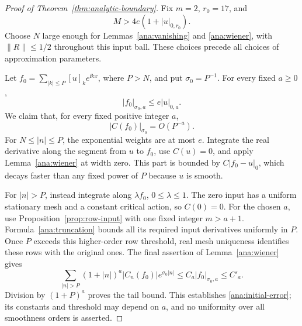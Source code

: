 \begin{proof}[Proof of Theorem~\ref{thm:analytic-boundary}]
Fix \(m=2\), \(r_0=17\), and
\[
 M>4e(1+|u|_{0,r_0}).
\]
Choose \(N\) large enough for Lemmas~\ref{ana:vanishing} and
\ref{ana:wiener}, with \(\|R\|\le1/2\) throughout this input ball.
These choices precede all choices of approximation parameters.

Let \(f_0=\sum_{|k|\le P}[u]_ke^{\ii kx}\), where \(P>N\), and
put \(\sigma_0=P^{-1}\).  For every fixed \(a\ge0\),
\begin{equation}\label{ana:truncation}
 |f_0|_{\sigma_0,a}\le e|u|_{0,a}.
\end{equation}
We claim that, for every fixed positive integer \(a\),
\begin{equation}\label{ana:initial-error}
 |C(f_0)|_{\sigma_0}=O(P^{-a}).
\end{equation}
For \(N\le|n|\le P\), the exponential weights are at most \(e\).
Integrate the real derivative along the segment from \(u\) to \(f_0\),
use \(C(u)=0\), and apply Lemma~\ref{ana:wiener} at width zero.
This part is bounded by \(C|f_0-u|_0\), which decays faster than
any fixed power of \(P\) because \(u\) is smooth.

For \(|n|>P\), instead integrate along \(\lambda f_0\),
\(0\le\lambda\le1\).  The zero input has a uniform stationary mesh
and a constant critical action, so \(C(0)=0\).  For the chosen \(a\),
use Proposition~\ref{prop:row-input} with one fixed integer
\(m>a+1\).  Formula~\eqref{ana:truncation} bounds all its required
input derivatives uniformly in \(P\).  Once \(P\) exceeds this
higher-order row threshold, real mesh uniqueness identifies these
rows with the original ones.  The final assertion of
Lemma~\ref{ana:wiener} gives
\[
 \sum_{|n|>P}(1+|n|)^a|C_n(f_0)|e^{\sigma_0|n|}
 \le C_a|f_0|_{\sigma_0,a}\le C'_a.
\]
Division by \((1+P)^a\) proves the tail bound.  This establishes
\eqref{ana:initial-error}; its constants and threshold may depend
on \(a\), and no uniformity over all smoothness orders is asserted.


\end{proof}
